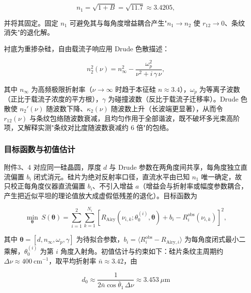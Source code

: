 \documentclass[withoutpreface,bwprint]{cumcmthesis}
\begin{document}
\begin{equation}
n_1 = \sqrt{1+B} = \sqrt{11.7} \approx 3.4205,
\label{eq:q3-n1}
\end{equation}

并将其固定。固定 $n_1$ 可避免其与每角度增益耦合产生"$n_1\to n_2$ 使 $r_{12}\to0$、条纹消失"的退化解。

衬底为重掺杂硅，自由载流子响应用 Drude 色散描述：

\begin{equation}
n_2^{2}(\nu) = n_\infty^{2} - \frac{\omega_p^{2}}{\nu^{2} + i\,\gamma\,\nu},
\label{eq:drude}
\end{equation}

其中 $n_\infty$ 为高频极限折射率（$\nu\to\infty$ 时趋于本征硅 $n\approx3.4$），$\omega_p$ 为等离子波数（正比于载流子浓度的平方根），$\gamma$ 为碰撞波数（反比于载流子迁移率）。Drude 色散使 $n_2'(\nu)$ 随波数下降、$\kappa_2(\nu)$ 随波数上升（长波端更显著），从而令 $r_{12}(\nu)$ 与条纹包络随波数衰减，且均匀作用于全部谐波，既不破坏多光束高阶项，又解释实测"条纹对比度随波数衰减约 6 倍"的包络。

\subsubsection{目标函数与初值估计}

附件3、4 对应同一硅晶圆，厚度 $d$ 与 Drude 参数在两角度间共享，每角度独立直流偏置 $b_i$ 闭式消元。硅片为绝对反射率口径，直流水平由已知 $n_1$ 唯一确定，故只校正每角度仪器直流偏置 $b_i$、不引入增益 $a$（增益会与折射率或幅度参数耦合，产生把近似平坦的理论值放大成虚假低残差的退化）。目标函数为

\begin{equation}
\min_{\boldsymbol{\theta}}\ S(\boldsymbol{\theta})
= \sum_{i=1}^{2}\sum_{k=1}^{N_i}
\left[ R_{\mathrm{Airy}}\left(\nu_{i,k}; \theta_0^{(i)}, \boldsymbol{\theta}\right)
+ b_i - R^{\mathrm{obs}}_{i}(\nu_{i,k}) \right]^{2},
\label{eq:q3-obj}
\end{equation}

其中 $\boldsymbol{\theta}=[d, n_\infty, \omega_p, \gamma]$ 为待拟合参数，$b_i=\langle R^{\mathrm{obs}}_i - R_{\mathrm{Airy},i}\rangle$ 为每角度闭式最小二乘解，$\theta_0^{(i)}$ 为第 $i$ 角度入射角。初值估计与约束如下：硅片条纹主周期约 $\Delta\nu\approx400\ \mathrm{cm^{-1}}$，取平均折射率 $\bar n\approx3.42$，由

\begin{equation}
d_0 \approx \frac{1}{2\bar n\cos\bar\theta_1\,\Delta\nu} \approx 3.453\ \mu\mathrm{m}
\label{eq:q3-d0}
\end{equation}
\end{document}
